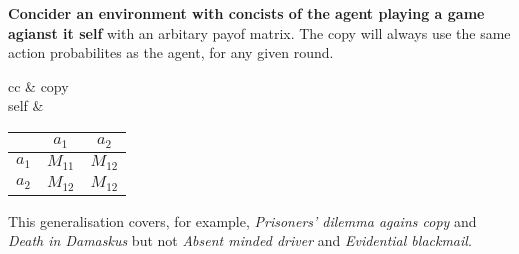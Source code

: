 \documentclass[a4paper]{article}
\begin{document}
\textbf{Concider an environment with concists of the agent playing a game agianst it self} with an arbitary payof matrix. The copy will always use the same action probabilites as the agent, for any given round.

\begin{tabular}{cc}
	& copy\\
	self
	& \begin{tabular}{c|c|c|}
		& $a_1$ & $a_2$ \\
		\hline
		$a_1$ & $M_{11}$ & $M_{12}$ \\
		\hline
		$a_2$ & $M_{12}$ & $M_{12}$ \\
		\hline
	\end{tabular}
\end{tabular}

This generalisation covers, for example, \textit{Prisoners' dilemma agains copy} and \textit{Death in Damaskus} but not \textit{Absent minded driver} and \textit{Evidential blackmail}.
\end{document}

